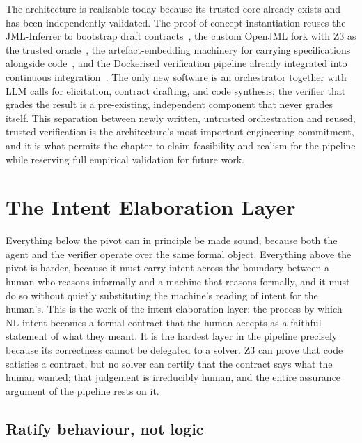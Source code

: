 The architecture is realisable today because its trusted core already exists and has been independently validated. The proof-of-concept instantiation reuses the JML-Inferrer to bootstrap draft contracts~\cite{edmonds_article1,edmonds_article3}, the custom OpenJML fork with Z3 as the trusted oracle~\cite{cok2014openjml,demoura2008z3}, the artefact-embedding machinery for carrying specifications alongside code~\cite{edmonds_article2}, and the Dockerised verification pipeline already integrated into continuous integration~\cite{edmonds_article4}. The only new software is an orchestrator together with LLM calls for elicitation, contract drafting, and code synthesis; the verifier that grades the result is a pre-existing, independent component that never grades itself. This separation between newly written, untrusted orchestration and reused, trusted verification is the architecture's most important engineering commitment, and it is what permits the chapter to claim feasibility and realism for the pipeline while reserving full empirical validation for future work.

\section{The Intent Elaboration Layer}\label{sec:a5-intent}

Everything below the pivot can in principle be made sound, because both the agent and the verifier operate over the same formal object. Everything above the pivot is harder, because it must carry intent across the boundary between a human who reasons informally and a machine that reasons formally, and it must do so without quietly substituting the machine's reading of intent for the human's. This is the work of the intent elaboration layer: the process by which NL intent becomes a formal contract that the human accepts as a faithful statement of what they meant. It is the hardest layer in the pipeline precisely because its correctness cannot be delegated to a solver. Z3 can prove that code satisfies a contract, but no solver can certify that the contract says what the human wanted; that judgement is irreducibly human, and the entire assurance argument of the pipeline rests on it.

\subsection{Ratify behaviour, not logic}\label{subsec:a5-ratify}

